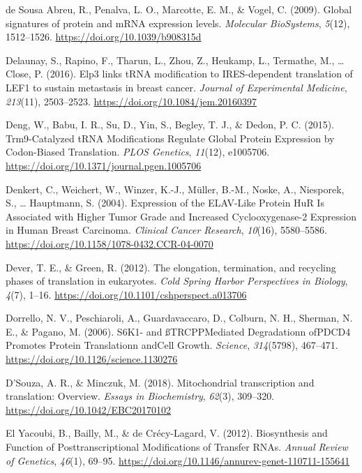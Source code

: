 \documentclass[12pt,openany]{book}
\begin{document}
\hypertarget{ref-deSousaAbreu2009}{}
de Sousa Abreu, R., Penalva, L. O., Marcotte, E. M., \& Vogel, C.
(2009). Global signatures of protein and mRNA expression levels.
\emph{Molecular BioSystems}, \emph{5}(12), 1512--1526.
\url{https://doi.org/10.1039/b908315d}

\hypertarget{ref-Delaunay2016}{}
Delaunay, S., Rapino, F., Tharun, L., Zhou, Z., Heukamp, L., Termathe,
M., \ldots{} Close, P. (2016). Elp3 links tRNA modification to
IRES-dependent translation of LEF1 to sustain metastasis in breast
cancer. \emph{Journal of Experimental Medicine}, \emph{213}(11),
2503--2523. \url{https://doi.org/10.1084/jem.20160397}

\hypertarget{ref-Deng2015}{}
Deng, W., Babu, I. R., Su, D., Yin, S., Begley, T. J., \& Dedon, P. C.
(2015). Trm9-Catalyzed tRNA Modifications Regulate Global Protein
Expression by Codon-Biased Translation. \emph{PLOS Genetics},
\emph{11}(12), e1005706.
\url{https://doi.org/10.1371/journal.pgen.1005706}

\hypertarget{ref-Denkert2004}{}
Denkert, C., Weichert, W., Winzer, K.-J., Müller, B.-M., Noske, A.,
Niesporek, S., \ldots{} Hauptmann, S. (2004). Expression of the
ELAV-Like Protein HuR Is Associated with Higher Tumor Grade and
Increased Cyclooxygenase-2 Expression in Human Breast Carcinoma.
\emph{Clinical Cancer Research}, \emph{10}(16), 5580--5586.
\url{https://doi.org/10.1158/1078-0432.CCR-04-0070}

\hypertarget{ref-Dever2012}{}
Dever, T. E., \& Green, R. (2012). The elongation, termination, and
recycling phases of translation in eukaryotes. \emph{Cold Spring Harbor
Perspectives in Biology}, \emph{4}(7), 1--16.
\url{https://doi.org/10.1101/cshperspect.a013706}

\hypertarget{ref-Dorrello2006}{}
Dorrello, N. V., Peschiaroli, A., Guardavaccaro, D., Colburn, N. H.,
Sherman, N. E., \& Pagano, M. (2006). S6K1- and ßTRCPPMediated
Degradationn ofPDCD4 Promotes Protein Translationn andCell Growth.
\emph{Science}, \emph{314}(5798), 467--471.
\url{https://doi.org/10.1126/science.1130276}

\hypertarget{ref-DSouza2018}{}
D'Souza, A. R., \& Minczuk, M. (2018). Mitochondrial transcription and
translation: Overview. \emph{Essays in Biochemistry}, \emph{62}(3),
309--320. \url{https://doi.org/10.1042/EBC20170102}

\hypertarget{ref-ElYacoubi2012}{}
El Yacoubi, B., Bailly, M., \& de Crécy-Lagard, V. (2012). Biosynthesis
and Function of Posttranscriptional Modifications of Transfer RNAs.
\emph{Annual Review of Genetics}, \emph{46}(1), 69--95.
\url{https://doi.org/10.1146/annurev-genet-110711-155641}
\end{document}
